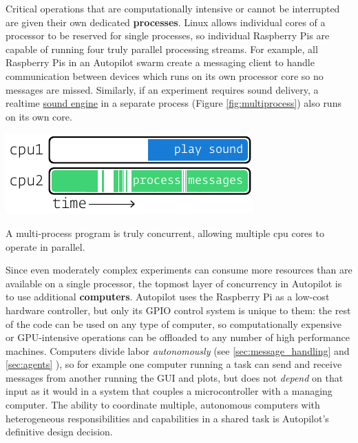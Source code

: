 Critical operations that are computationally intensive or cannot be interrupted are given their own dedicated \textbf{processes}. Linux allows individual cores of a processor to be reserved for single processes, so individual Raspberry Pis are capable of running four truly parallel processing streams. For example, all Raspberry Pis in an Autopilot swarm create a messaging client to handle communication between devices which runs on its own processor core so no messages are missed. Similarly, if an experiment requires sound delivery, a realtime \hyperref[sec:stim]{sound engine} in a separate process (Figure \ref{fig:multiprocess}) also runs on its own core.

\begin{marginfigure}[0.1cm]
 \includegraphics[]{figures/side_14_multiprocess.pdf}
 \caption{A multi-process program is truly concurrent, allowing multiple cpu cores to operate in parallel.}
 \label{fig:multiprocess}
\end{marginfigure}

Since even moderately complex experiments can consume more resources than are available on a single processor, the topmost layer of concurrency in Autopilot is to use additional \textbf{computers}. Autopilot uses the Raspberry Pi as a low-cost hardware controller, but only its GPIO control system is unique to them: the rest of the code can be used on any type of computer, so computationally expensive or GPU-intensive operations can be offloaded to any number of high performance machines. Computers divide labor \textit{autonomously} (see \ref{sec:message_handling} and \ref{sec:agents} ), so for example one computer running a task can send and receive messages from another running the GUI and plots, but does not \textit{depend} on that input as it would in a system that couples a microcontroller with a managing computer. The ability to coordinate multiple, autonomous computers with heterogeneous responsibilities and capabilities in a shared task is Autopilot's definitive design decision.